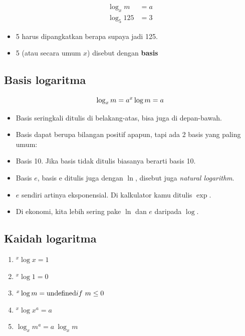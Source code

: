 \documentclass[
  letterpaper,
  DIV=11,
  numbers=noendperiod]{scrartcl}
\providecommand{\tightlist}{%
  \setlength{\itemsep}{0pt}\setlength{\parskip}{0pt}}\usepackage{longtable,booktabs,array}
\begin{document}
\[
\begin{align}
\log_x {m} &= a \\
\log_5 {125} &= 3
\end{align}
\]

\begin{itemize}
\item
  5 harus dipangkatkan berapa supaya jadi 125.
\item
  5 (atau secara umum \(x\)) disebut dengan \textbf{basis}
\end{itemize}

\hypertarget{basis-logaritma}{%
\subsection{Basis logaritma}\label{basis-logaritma}}

\[
\log_x m=a \\
^x \log m=a
\]

\begin{itemize}
\item
  Basis seringkali ditulis di belakang-atas, bisa juga di depan-bawah.
\item
  Basis dapat berupa bilangan positif apapun, tapi ada 2 basis yang
  paling umum:
\item
  Basis 10. Jika basis tidak ditulis biasanya berarti basis 10.
\item
  Basis \(e\), basis e ditulis juga dengan \(\ln\), disebut juga
  \emph{natural logarithm}.
\item
  \(e\) sendiri artinya eksponensial. Di kalkulator kamu ditulis
  \(\exp\).
\item
  Di ekonomi, kita lebih sering pake \(\ln\) dan \(e\) daripada
  \(\log\).
\end{itemize}

\hypertarget{kaidah-logaritma}{%
\subsection{Kaidah logaritma}\label{kaidah-logaritma}}

\begin{enumerate}
\def\labelenumi{\arabic{enumi}.}
\tightlist
\item
  \(^x \log x = 1\)
\item
  \(^x \log 1 = 0\)
\item
  \(^x \log m = \text{undefined} \\ if\ m \le 0\)
\item
  \(^x \log x^a=a\)
\item
  \(\log_x m^a = a \ \log_x m\)
\end{enumerate}
\end{document}
